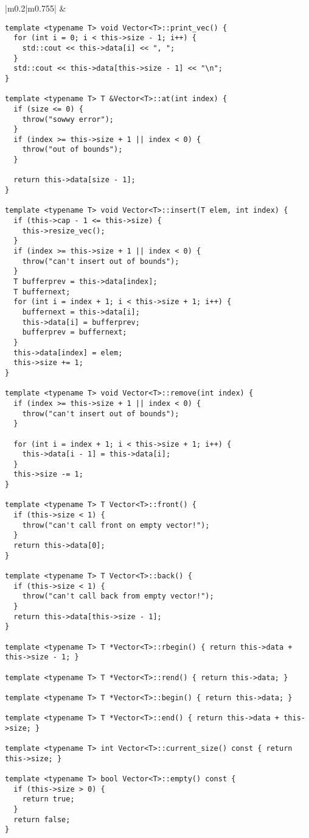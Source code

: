 \documentclass[main.tex,fontsize=8pt,paper=a4,paper=portrait,DIV=calc,]{scrartcl}
\begin{document}
\begin{table}[ht!]
\begin{tabular}{|m{0.2\linewidth}|m{0.755\linewidth}|}
\hline
& 
\begin{lstlisting}
template <typename T> void Vector<T>::print_vec() {
  for (int i = 0; i < this->size - 1; i++) {
    std::cout << this->data[i] << ", ";
  }
  std::cout << this->data[this->size - 1] << "\n";
}

template <typename T> T &Vector<T>::at(int index) {
  if (size <= 0) {
    throw("sowwy error");
  }
  if (index >= this->size + 1 || index < 0) {
    throw("out of bounds");
  }

  return this->data[size - 1];
}

template <typename T> void Vector<T>::insert(T elem, int index) {
  if (this->cap - 1 <= this->size) {
    this->resize_vec();
  }
  if (index >= this->size + 1 || index < 0) {
    throw("can't insert out of bounds");
  }
  T bufferprev = this->data[index];
  T buffernext;
  for (int i = index + 1; i < this->size + 1; i++) {
    buffernext = this->data[i];
    this->data[i] = bufferprev;
    bufferprev = buffernext;
  }
  this->data[index] = elem;
  this->size += 1;
}

template <typename T> void Vector<T>::remove(int index) {
  if (index >= this->size + 1 || index < 0) {
    throw("can't insert out of bounds");
  }

  for (int i = index + 1; i < this->size + 1; i++) {
    this->data[i - 1] = this->data[i];
  }
  this->size -= 1;
}

template <typename T> T Vector<T>::front() {
  if (this->size < 1) {
    throw("can't call front on empty vector!");
  }
  return this->data[0];
}

template <typename T> T Vector<T>::back() {
  if (this->size < 1) {
    throw("can't call back from empty vector!");
  }
  return this->data[this->size - 1];
}

template <typename T> T *Vector<T>::rbegin() { return this->data + this->size - 1; }

template <typename T> T *Vector<T>::rend() { return this->data; }

template <typename T> T *Vector<T>::begin() { return this->data; }

template <typename T> T *Vector<T>::end() { return this->data + this->size; }

template <typename T> int Vector<T>::current_size() const { return this->size; }

template <typename T> bool Vector<T>::empty() const {
  if (this->size > 0) {
    return true;
  }
  return false;
}
\end{lstlisting}
\\
\hline
\end{tabular}
\end{table}
\end{document}
